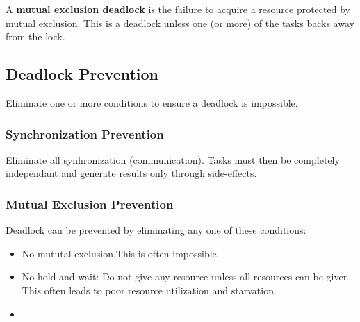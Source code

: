 \documentclass[12pt]{article}
\begin{document}
A {\bf mutual exclusion deadlock} is the failure to acquire a resource protected by mutual exclusion. This is a deadlock unless one (or more) of the tasks backs away from the lock.

\subsection{Deadlock Prevention}
Eliminate one or more conditions to ensure a deadlock is impossible.

\subsubsection{Synchronization Prevention}
Eliminate all synhronization (communication). Tasks must then be completely independant and generate results only through side-effects.

\subsubsection{Mutual Exclusion Prevention}
Deadlock can be prevented by eliminating any one of these conditions:
\begin{itemize}
\item No mututal exclusion.This is often impossible.
\item No hold and wait: Do not give any resource unless all resources can be given. This often leads to poor resource utilization and starvation.
\item
\end{itemize}
\end{document}
